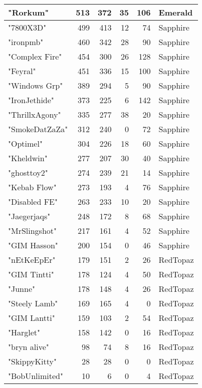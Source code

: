\documentclass{article}
\begin{document}
\begin{table}[htbp]
\begin{tabular}{|l|r|r|r|r|l|}
"Rorkum" & 513 & 372 & 35 & 106 & Emerald \\ \hline
"7800X3D" & 499 & 413 & 12 & 74 & Sapphire \\ \hline
"ironpmb" & 460 & 342 & 28 & 90 & Sapphire \\ \hline
"Complex Fire" & 454 & 300 & 26 & 128 & Sapphire \\ \hline
"Feyral" & 451 & 336 & 15 & 100 & Sapphire \\ \hline
"Windows Grp" & 389 & 294 & 5 & 90 & Sapphire \\ \hline
"IronJethide" & 373 & 225 & 6 & 142 & Sapphire \\ \hline
"ThrillxAgony" & 335 & 277 & 38 & 20 & Sapphire \\ \hline
"SmokeDatZaZa" & 312 & 240 & 0 & 72 & Sapphire \\ \hline
"Optimel" & 304 & 226 & 18 & 60 & Sapphire \\ \hline
"Kheldwin" & 277 & 207 & 30 & 40 & Sapphire \\ \hline
"ghosttoy2" & 274 & 239 & 21 & 14 & Sapphire \\ \hline
"Kebab Flow" & 273 & 193 & 4 & 76 & Sapphire \\ \hline
"Disabled FE" & 263 & 233 & 10 & 20 & Sapphire \\ \hline
"Jaegerjaqs" & 248 & 172 & 8 & 68 & Sapphire \\ \hline
"MrSlingshot" & 217 & 161 & 4 & 52 & Sapphire \\ \hline
"GIM Hasson" & 200 & 154 & 0 & 46 & Sapphire \\ \hline
"nEtKeEpEr" & 179 & 151 & 2 & 26 & RedTopaz \\ \hline
"GIM Tintti" & 178 & 124 & 4 & 50 & RedTopaz \\ \hline
"Junne" & 178 & 148 & 4 & 26 & RedTopaz \\ \hline
"Steely Lamb" & 169 & 165 & 4 & 0 & RedTopaz \\ \hline
"GIM Lantti" & 159 & 103 & 2 & 54 & RedTopaz \\ \hline
"Harglet" & 158 & 142 & 0 & 16 & RedTopaz \\ \hline
"bryn alive" & 98 & 74 & 8 & 16 & RedTopaz \\ \hline
"SkippyKitty" & 28 & 28 & 0 & 0 & RedTopaz \\ \hline
"BobUnlimited" & 10 & 6 & 0 & 4 & RedTopaz \\ \hline
\end{tabular}
\end{table}
\end{document}
